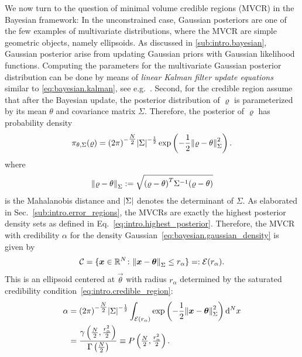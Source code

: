 We now turn to the question of minimal volume credible regions (MVCR) in the Bayesian framework:
In the unconstrained case, Gaussian posteriors are one of the few examples of multivariate distributions, where the MVCR are simple geometric objects, namely ellipsoids.
As discussed in \cref{sub:intro.bayesian}, Gaussian posterior arise from updating Gaussian priors with Gaussian likelihood functions.
Computing the parameters for the multivariate Gaussian posterior distribution can be done by means of \emph{linear Kalman filter update equations} similar to \cref{eq:bayesian.kalman}, see e.g.~\cite[Sec.\ 2.4]{Audenaert_2009_Quantum}.
Second, for the credible region assume that after the Bayesian update, the posterior distribution of $\varrho$ is parameterized by its mean $\theta$ and covariance matrix $\Sigma$.
Therefore, the posterior of $\varrho$ has probability density
\begin{equation}
  \label{eq:bayesian.gaussian_density}
  \pi_{\theta,\Sigma}(\varrho) = {(2\pi)}^{-\tfrac{N}{2}} {\vert\Sigma\vert}^{-\frac{1}{2}} \exp\left( -\frac{1}{2} {\Vert\varrho - \theta\Vert}_\Sigma^2 \right).
\end{equation}
where
\begin{equation}
  {\Vert\varrho - \theta\Vert}_\Sigma := \sqrt{{(\varrho - \theta)}^T \Sigma^{-1} (\varrho - \theta)}
\end{equation}
is the Mahalanobis distance and  ${\vert\Sigma\vert}$ denotes the determinant of $\Sigma$.
As elaborated in Sec.~\ref{sub:intro.error_regions}, the MVCRs are exactly the highest posterior density sets as defined in Eq.~\eqref{eq:intro.highest_posterior}.
Therefore, the MVCR with credibility $\alpha$ for the density Gaussian~\eqref{eq:bayesian.gaussian_density} is given by
\begin{equation}
  \label{eq:bayesian.gaussian_cr}
  \mathcal{C} = \{ \boldsymbol{x} \in \mathbb{R}^N\colon {\Vert\boldsymbol{x} - \boldsymbol{\theta}\Vert}_\Sigma \le r_{\alpha} \} =: \mathcal{E}(r_{\alpha}).
\end{equation}
This is an ellipsoid centered at $\vec\theta$ with radius $r_{\alpha}$ determined by the saturated credibility condition~\eqref{eq:intro.credible_region}:
\begin{equation}
  \label{eq:bayesian.radius}
  \begin{split}
    \alpha
    &= {(2\pi)}^{-\tfrac{N}{2}} {\vert\Sigma\vert}^{-\frac{1}{2}} \int_{\mathcal{E}(r_{\alpha})} \exp\left( -\frac{1}{2} {\Vert\boldsymbol{x} - \boldsymbol{\theta}\Vert}_\Sigma^2 \right) \mathrm{d}^N x \\
    &= \frac{\gamma\left( \tfrac{N}{2}, \frac{r^2_{\alpha}}{2} \right)}{\Gamma\left( \tfrac{N}{2} \right)}
    \equiv P\left( \tfrac{N}{2}, \tfrac{r^2_{\alpha}}{2} \right).
    \end{split}
\end{equation}
